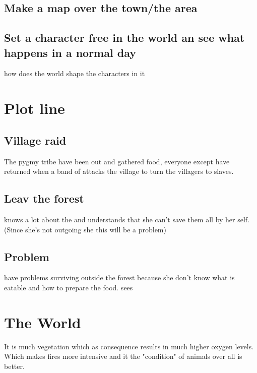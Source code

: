 \documentclass{article}
\begin{document}
\subsection{Make a map over the town/the area}

\subsection{Set a character free in the world an see what happens in a normal day}

\begin{description}
\item[how does the world shape the characters in it] 
\end{description}


\newpage
\section{Plot line}
\subsection{Village raid}
The pygmy tribe have been out and gathered food, everyone except  have returned when a band of  attacks the village to turn the villagers to slaves.

\subsection{Leav the forest} knows a lot about the  and understands that she can't save them all by her self. (Since she's not outgoing she this will be a problem)

\subsection{Problem}  have problems surviving outside the forest because she don't know what is eatable and how to prepare the food. sees 

\section{The World}
\label{world}
It is much vegetation which as consequence results in much higher oxygen levels. Which makes fires more intensive and it the "condition" of animals over all is better.
\end{document}
